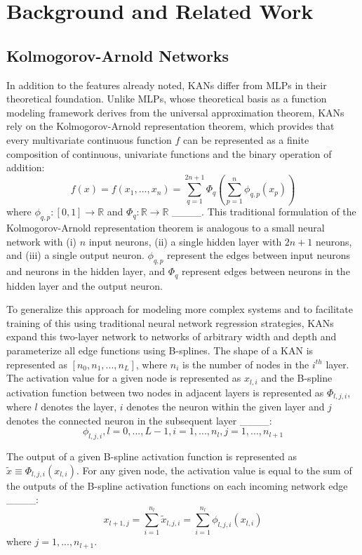 \section{Background and Related Work}
\subsection{Kolmogorov-Arnold Networks}
In addition to the features already noted, KANs differ from MLPs in their theoretical foundation.  Unlike MLPs, whose theoretical basis as a function modeling framework derives from the universal approximation theorem,  KANs rely on the Kolmogorov-Arnold representation theorem, which provides that every multivariate continuous function \(f\) can be represented as a finite composition of continuous, univariate functions and the binary operation of addition:
\begin{equation}
f(x) = f(x_1, ..., x_n) = \sum_{q=1}^{2n+1} \Phi_q (\sum_{p=1}^n \phi_{q,p} (x_p))
\end{equation}
where \(\phi_{q,p} : [0,1] \rightarrow \mathbb{R}\) and \(\Phi_q : \mathbb{R} \rightarrow \mathbb{R}\) ____. 
This traditional formulation of the Kolmogorov-Arnold representation theorem is analogous to a small neural network with (i) \(n\) input neurons, (ii) a single hidden layer with \(2n+1\) neurons, and (iii) a single output neuron.  \(\phi_{q,p}\) represent the edges between input neurons and neurons in the hidden layer, and \(\Phi_q\) represent edges between neurons in the hidden layer and the output neuron.

To generalize this approach for modeling more complex systems and to facilitate training of this using traditional neural network regression strategies, KANs expand this two-layer network to networks of arbitrary width and depth and parameterize all edge functions using B-splines.  The shape of a KAN is represented as \([n_0, n_1, ..., n_L]\), where \(n_i\) is the number of nodes in the \(i^{th}\) layer.  The activation value for a given node is represented as \(x_{l,i}\) and the B-spline activation function between two nodes in adjacent layers is represented as \(\Phi_{l, j, i}\), where \(l\) denotes the layer, \(i\) denotes the neuron within the given layer and \(j\) denotes the connected neuron in the subsequent layer ____:
\begin{equation}
\phi_{l,j,i}, l=0, ..., L-1, i=1, ..., n_l, j=1, ..., n_{l+1}
\end{equation}

The output of a given B-spline activation function is represented as \(\tilde{x} \equiv \Phi_{l,j,i} (x_{l,i})\).   For any given node, the activation value is equal to the sum of the outputs of the B-spline activation functions on each incoming network edge ____:
\begin{equation}
x_{l+1, j} = \sum_{i=1}^{n_l} \tilde{x}_{l,j,i} = \sum_{i=1}^{n_l} \phi_{l,j,i} (x_{l,i})
\end{equation}
where \(j = 1, ..., n_{l+1}\).

